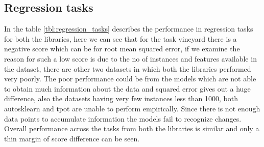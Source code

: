 \subsection{Regression tasks}
In the table \ref{tbl:regression_tasks} describes the performance in regression tasks for both the libraries, here we can see that for the task vineyard there is a negative score which can be for root mean squared error, if we examine the reason for such a low score is due to the no of instances and features available in the dataset, there are other two datasets in which both the libraries performed very poorly. The poor performance could be from the models which are not able to obtain much information about the data and squared error gives out a huge difference, also the datasets having very few instances less than 1000, both autosklearn and tpot are unable to perform empirically. Since there is not enough data points to accumulate information the models fail to recognize changes. Overall performance across the tasks
from both the libraries is similar and only a thin margin of score difference can be seen.
